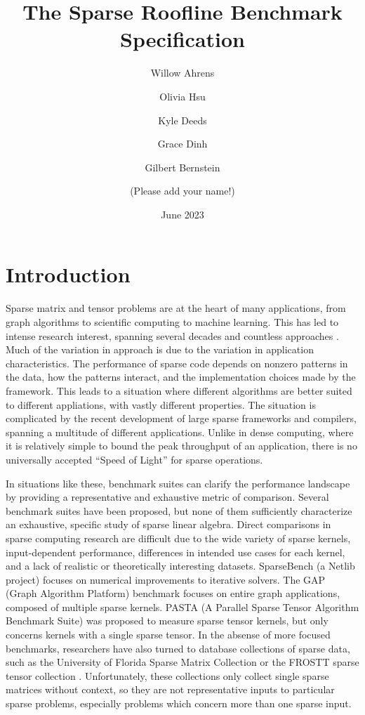 \documentclass{article}
\title{The Sparse Roofline Benchmark Specification}
\author{Willow Ahrens \and
	Olivia Hsu \and
	Kyle Deeds \and
	Grace Dinh \and
	Gilbert Bernstein \and
	(Please add your name!)}
\date{June 2023}
\begin{document}
\maketitle

\section{Introduction}

Sparse matrix and tensor problems are at the heart of many applications, from graph algorithms to scientific computing to machine learning.
%
This has led to intense research interest, spanning several decades and countless approaches \cite{gao_systematic_2024}.
%
Much of the variation in approach is due to the variation in application characteristics.
%
The performance of sparse code depends on nonzero patterns in the data, how the patterns interact, and the implementation choices made by the framework.
%
This leads to a situation where different algorithms are better suited to different appliations, with vastly different properties.
%
The situation is complicated by the recent development of large sparse frameworks and compilers, spanning a multitude of different applications.
%
Unlike in dense computing, where it is relatively simple to bound the peak throughput of an application, there is no universally accepted ``Speed of Light'' for sparse operations.

In situations like these, benchmark suites can clarify the performance landscape by providing a representative and exhaustive metric of comparison.
%
Several benchmark suites have been proposed, but none of them sufficiently characterize an exhaustive, specific study of sparse linear algebra.
%
Direct comparisons in sparse computing research are difficult due to the wide variety of sparse kernels, input-dependent performance, differences in intended use cases for each kernel, and a lack of realistic or theoretically interesting datasets.
%
SparseBench (a Netlib project) focuses on numerical improvements to iterative solvers\cite{noauthor_sparsebench_nodate}.
%
The GAP (Graph Algorithm Platform) benchmark focuses on entire graph applications, composed of multiple sparse kernels\cite{beamer_gap_2017}.
%
PASTA (A Parallel Sparse Tensor Algorithm Benchmark Suite) was proposed to measure sparse tensor kernels, but only concerns kernels with a single sparse tensor\cite{li_pasta_2019}. 
%
In the absense of more focused benchmarks, researchers have also turned to database collections of sparse data, such as the University of Florida Sparse Matrix Collection \cite{davis_university_2011} or the FROSTT sparse tensor collection \cite{smith_frostt_2017}.
%
Unfortunately, these collections only collect single sparse matrices without context, so they are not representative inputs to particular sparse problems, especially problems which concern more than one sparse input.
\end{document}

